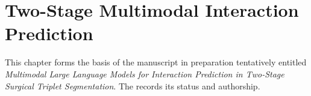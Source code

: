\chapter{Two-Stage Multimodal Interaction Prediction}
\label{chap:two-stage-interaction}
\minitoc

This chapter forms the basis of the manuscript in preparation tentatively entitled \emph{Multimodal Large Language Models for Interaction Prediction in Two-Stage Surgical Triplet Segmentation}. The  records its status and authorship.

\begingroup
\setlength{\emergencystretch}{2em}
\graphicspath{{phd_papers/sources/Two_Stage_Surgical_Triplet_Segmentation/}}
\providecommand{\ivttriplet}{\texttt{$\langle$instrument, verb, target$\rangle$}\xspace}
\providecommand{\vtpair}{\texttt{$\langle$verb, target$\rangle$}\xspace}
\providecommand{\ivpair}{\texttt{$\langle$instrument, verb$\rangle$}\xspace}
\providecommand{\itpair}{\texttt{$\langle$instrument, target$\rangle$}\xspace}
\providecommand{\figref}[1]{Figure~\ref{#1}}
\providecommand{\tabref}[1]{Table~\ref{#1}}
\providecommand{\secref}[1]{Section~\ref{#1}}
\newif\ifcFiveSupplement
\newif\ifcFiveTraining
\newif\ifcFiveErrorAnalysis
{}

\endgroup
